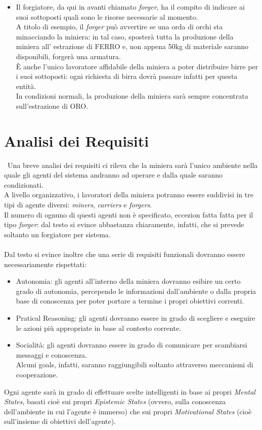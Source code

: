 \documentclass{llncs}
\begin{document}
\begin{itemize}
\item Il forgiatore, da qui in avanti chiamato \textit{forger}, ha il compito di indicare ai suoi sottoposti quali sono le risorse necessarie al momento.\\
A titolo di esempio, il \textit{forger} può avvertire se una orda di orchi sta minacciando la miniera: in tal caso, sposterà tutta la produzione della miniera all' estrazione di FERRO e, non appena 50kg di materiale saranno disponibili, forgerà una armatura.\\
È anche l'unico lavoratore affidabile della miniera a poter distribuire birre per i suoi sottoposti: ogni richiesta di birra dovrà passare infatti per questa entità.\\
In condizioni normali, la produzione della miniera sarà sempre concentrata sull'estrazione di ORO.
\end{itemize}
\newpage
\section{Analisi dei Requisiti}\
Una breve analisi dei requisiti ci rileva che la miniera sarà l'unico ambiente nella quale gli agenti del sistema andranno ad operare e dalla quale saranno condizionati.\\
A livello organizzativo, i lavoratori della miniera potranno essere suddivisi in tre tipi di agente diversi: \textit{miners}, \textit{carriers} e \textit{forgers}.\\Il numero di ognuno di questi agenti non è specificato, eccezion fatta fatta per il tipo \textit{forger}: dal testo si evince abbastanza chiaramente, infatti, che si prevede soltanto un forgiatore per sistema.\\\\
Dal testo si evince inoltre che una serie di requisiti funzionali dovranno essere necessariamente rispettati:
\begin{itemize}
\item Autonomia: gli agenti all'interno della miniera dovranno esibire un certo grado di autonomia, percependo le informazioni dall'ambiente o dalla propria base di conoscenza per poter portare a termine i propri obiettivi correnti.\\
\item Pratical Reasoning: gli agenti dovranno essere in grado di scegliere e eseguire le azioni più appropriate in base al contesto corrente.\\
\item Socialità: gli agenti dovranno essere in grado di comunicare per scambiarsi messaggi e conoscenza.\\
Alcuni goals, infatti, saranno raggiungibili soltanto attraverso meccanismi di cooperazione.
\end{itemize}
Ogni agente sarà in grado di effettuare scelte intelligenti in base ai propri \textit{Mental States}, basati cioè sui propri \textit{Epistemic States} (ovvero, sulla conoscenza dell'ambiente in cui l'agente è immerso) che sui propri \textit{Motivational States} (cioè sull'insieme di obiettivi dell'agente).
\newpage
\end{document}
